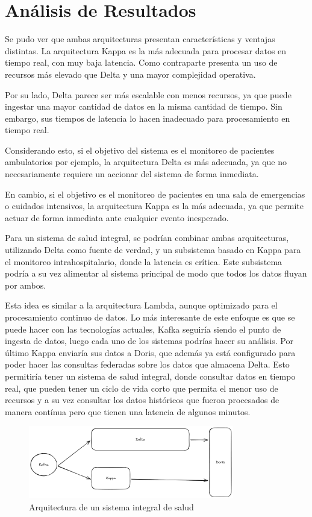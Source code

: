 \section{Análisis de Resultados}

Se pudo ver que ambas arquitecturas presentan características y ventajas distintas. 
La arquitectura Kappa es la más adecuada para procesar datos en tiempo real, con muy baja latencia. 
Como contraparte presenta un uso de recursos más elevado que Delta y una mayor complejidad operativa.

Por su lado, Delta parece ser más escalable con menos recursos, 
ya que puede ingestar una mayor cantidad de datos en la misma cantidad de tiempo.
Sin embargo, sus tiempos de latencia lo hacen inadecuado para procesamiento en tiempo real. 

Considerando esto, si el objetivo del sistema es el monitoreo de pacientes ambulatorios por ejemplo, 
la arquitectura Delta es más adecuada, ya que no necesariamente requiere un accionar del sistema de forma inmediata.

En cambio, si el objetivo es el monitoreo de pacientes en una sala de emergencias o cuidados intensivos,
la arquitectura Kappa es la más adecuada, ya que permite actuar de forma inmediata ante cualquier evento inesperado.

Para un sistema de salud integral, se podrían combinar ambas arquitecturas, 
utilizando Delta como fuente de verdad, y un subsistema basado en Kappa para el monitoreo intrahospitalario,
donde la latencia es crítica. 
Este subsistema podría a su vez alimentar al sistema principal de modo que todos los datos fluyan por ambos.

Esta idea es similar a la arquitectura Lambda, aunque optimizado para el procesamiento continuo de datos.
Lo más interesante de este enfoque es que se puede hacer con las tecnologías actuales,
Kafka seguiría siendo el punto de ingesta de datos, 
luego cada uno de los sistemas podrías hacer su análisis. Por último Kappa enviaría sus datos a Doris, 
que además ya está configurado para poder hacer las consultas federadas sobre los datos que almacena Delta. 
Esto permitiría tener un sistema de salud integral, 
donde consultar datos en tiempo real, que pueden tener un ciclo de vida corto que permita el menor uso de recursos 
y a su vez consultar los datos históricos que fueron procesados de manera contínua pero que tienen una latencia de 
algunos minutos. 

\begin{figure}
    \centering
    \includegraphics[width=0.8\textwidth]{resultados/combine.png}
    \caption{Arquitectura de un sistema integral de salud}
    \label{fig:analisis}
\end{figure}